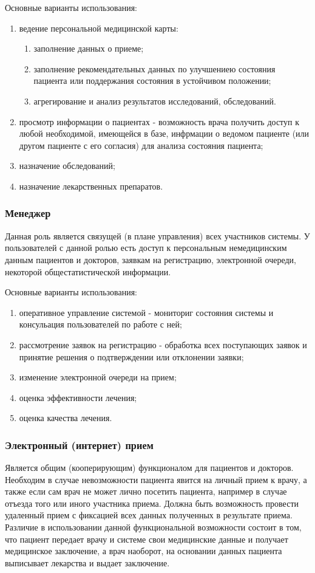 Основные варианты использования:	
\begin{enumerate}
  \item ведение персональной медицинской карты:
  \begin{enumerate}
  	\item заполнение данных о приеме;
  	\item заполнение рекомендательных данных по улучшениею состояния пациента
  	или поддержания состояния в устойчивом положении;
  	\item агрегирование и анализ результатов исследований, обследований.
  \end{enumerate}
  \item просмотр информации о пациентах - возможность врача получить доступ к
  любой необходимой, имеющейся в базе, инфрмации о ведомом пациенте (или другом
  пациенте с его согласия) для анализа состояния пациента;
  \item назначение обследований;
  \item назначение лекарственных препаратов. 
\end{enumerate}

\subsubsection{Менеджер}
Данная роль является связущей (в плане управления) всех участников системы. У
пользователей с данной ролью есть доступ к персональным немедицинским данным
пациентов и докторов, заявкам на регистрацию, электронной очереди, некоторой
общестатистической информации.

Основные варианты использования:

\begin{enumerate}
  \item оперативное управление системой - мониториг состояния системы и
  консульация пользователей по работе с ней;
  \item рассмотрение заявок на регистрацию - обработка всех поступающих заявок и
  принятие решения о подтверждении или отклонении заявки;
  \item изменение электронной очереди на прием;
  \item оценка эффективности лечения;
  \item оценка качества лечения.
\end{enumerate}

\subsubsection{Электронный (интернет) прием}
Является общим (кооперирующим) функционалом для пациентов и докторов. Необходим
в случае невозможности пациента явится на личный прием к врачу, а также если сам
врач не может лично посетить пациента, например в случае отъезда того или иного
участника приема. Должна быть возможность провести удаленный прием с фиксацией
всех данных полученных в результате приема. Различие в использовании данной
функциональной возможности состоит в том, что пациент передает врачу и системе
свои медицинские данные и получает медицинское заключение, а врач наоборот, на
основании данных пациента выписывает лекарства и выдает заключение.

